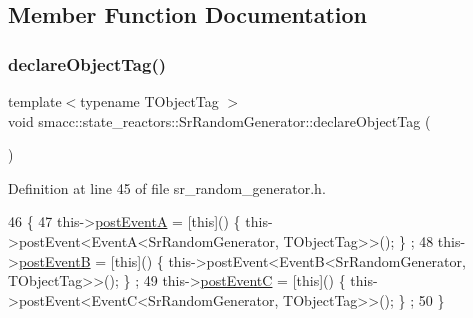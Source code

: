 \subsection{Member Function Documentation}
\mbox{\label{classsmacc_1_1state__reactors_1_1SrRandomGenerator_a3c8db60268bcffc709a482f2cf302d41}} 
\subsubsection{\texorpdfstring{declare\+Object\+Tag()}{declareObjectTag()}}
{\footnotesize\ttfamily template$<$typename T\+Object\+Tag $>$ \\
void smacc\+::state\+\_\+reactors\+::\+Sr\+Random\+Generator\+::declare\+Object\+Tag (\begin{DoxyParamCaption}{ }\end{DoxyParamCaption})\hspace{0.3cm}{\ttfamily [inline]}}



Definition at line 45 of file sr\+\_\+random\+\_\+generator.\+h.


\begin{DoxyCode}
46     \{
47         this->\hyperlink{classsmacc_1_1state__reactors_1_1SrRandomGenerator_ac157de4b848ebc5da1acb593f7b25108}{postEventA} = [\textcolor{keyword}{this}]() \{ this->postEvent<EventA<SrRandomGenerator, TObjectTag>>(); \}
      ;
48         this->\hyperlink{classsmacc_1_1state__reactors_1_1SrRandomGenerator_a0b38db23bf80e0709c2ae51c6a64ac1c}{postEventB} = [\textcolor{keyword}{this}]() \{ this->postEvent<EventB<SrRandomGenerator, TObjectTag>>(); \}
      ;
49         this->\hyperlink{classsmacc_1_1state__reactors_1_1SrRandomGenerator_a1aeb07de7b52a9f5811e5f60444731a0}{postEventC} = [\textcolor{keyword}{this}]() \{ this->postEvent<EventC<SrRandomGenerator, TObjectTag>>(); \}
      ;
50     \}
\end{DoxyCode}
\mbox{\label{classsmacc_1_1state__reactors_1_1SrRandomGenerator_a093fa3de1ca4f84c74cc0cb0f093cb31}} 
